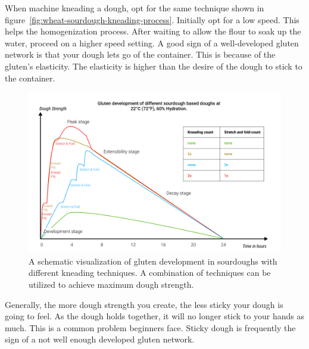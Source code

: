 When machine kneading a dough, opt for the same technique shown in figure~\ref*{fig:wheat-sourdough-kneading-process}.
Initially opt for a low speed. This helps the homogenization process.
After waiting to allow the flour to soak up the water, proceed on a higher speed
setting. A good sign of a well-developed gluten network is
that your dough lets go of the container. This is because of the gluten's elasticity.
The elasticity is higher than the desire of the
dough to stick to the container.

\begin{figure}[!htb]
  \includegraphics[width=\textwidth]{dough-strength-sourdough}
  \caption{A schematic visualization of
  gluten development in sourdoughs with different kneading techniques.
  A combination of techniques can be utilized to achieve maximum
  dough strength.}%
  \label{fig:dough-strength-sourdough}
\end{figure}

Generally, the more dough strength you create, the less sticky your dough is going to
feel. As the dough holds together, it will no longer stick to your hands as
much. This is a common problem beginners face. Sticky dough is frequently
the sign of a not well enough developed gluten network.

